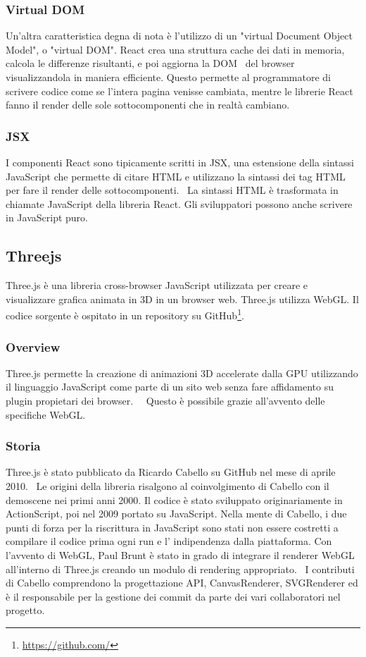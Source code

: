 \subsubsection{Virtual DOM}
Un'altra caratteristica degna di nota è l'utilizzo di un "virtual Document Object Model", o "virtual DOM".
React crea una struttura cache dei dati in memoria, calcola le differenze risultanti, e poi aggiorna
la DOM~\cite{reactdom} del browser visualizzandola in maniera efficiente.
Questo permette al programmatore di scrivere codice come se
l'intera pagina venisse cambiata, mentre le librerie React fanno il render delle sole sottocomponenti che in realtà cambiano.

\subsubsection{JSX}
I componenti React sono tipicamente scritti in JSX, una estensione della sintassi JavaScript che permette di citare
HTML e utilizzano la sintassi dei tag HTML per fare  il render delle sottocomponenti.~\cite{jsx}
La sintassi HTML è trasformata in chiamate JavaScript
della libreria React. Gli sviluppatori possono anche scrivere in JavaScript puro.


\newpage
\subsection{Threejs}
\label{sec:chapter_2_section_3_sub_2}
Three.js \`e una libreria cross-browser JavaScript utilizzata per creare e visualizzare grafica animata in 3D
in un browser web. Three.js utilizza WebGL. Il codice sorgente è ospitato in un repository su GitHub\footnote{\url{https://github.com/}}.

\subsubsection{Overview}
Three.js permette la creazione di animazioni 3D accelerate dalla GPU utilizzando il linguaggio JavaScript
come parte di un sito web senza fare affidamento su plugin propietari dei browser.~\cite{O3D}~\cite{unity}
 Questo è possibile grazie all'avvento delle specifiche WebGL.~\cite{khronos}

\subsubsection{Storia}
Three.js è stato pubblicato da Ricardo Cabello su GitHub nel mese di aprile 2010.~\cite{Firstcommit}
Le origini della libreria risalgono al coinvolgimento di Cabello con il demoscene nei primi anni 2000.
Il codice \`e stato sviluppato originariamente in ActionScript, poi nel 2009 portato su JavaScript. Nella mente di Cabello,
i due punti di forza per la riscrittura in JavaScript sono stati non essere costretti a compilare il codice prima
ogni run e l' indipendenza dalla piattaforma. Con l'avvento di WebGL, Paul Brunt è stato in grado di integrare il renderer
WebGL all'interno di Three.js creando un modulo di rendering appropriato.~\cite{develop}
I contributi di Cabello comprendono la progettazione API, CanvasRenderer, SVGRenderer ed è il
responsabile per la gestione dei commit da parte dei vari collaboratori nel progetto.

